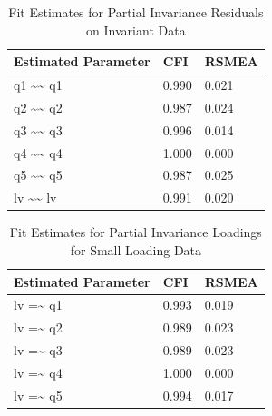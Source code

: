 \documentclass[
  man]{apa7}
\begin{document}
\begin{table}[tbp]

\begin{center}
\begin{threeparttable}

\caption{\label{tab:p-tab11}Fit Estimates for Partial Invariance Residuals on Invariant Data}

\begin{tabular}{lll}
\toprule
Estimated Parameter & CFI & RSMEA\\
\midrule
q1 \textasciitilde{}\textasciitilde{} q1 & 0.990 & 0.021\\
q2 \textasciitilde{}\textasciitilde{} q2 & 0.987 & 0.024\\
q3 \textasciitilde{}\textasciitilde{} q3 & 0.996 & 0.014\\
q4 \textasciitilde{}\textasciitilde{} q4 & 1.000 & 0.000\\
q5 \textasciitilde{}\textasciitilde{} q5 & 0.987 & 0.025\\
lv \textasciitilde{}\textasciitilde{} lv & 0.991 & 0.020\\
\bottomrule
\end{tabular}

\end{threeparttable}
\end{center}

\end{table}

\begin{table}[tbp]

\begin{center}
\begin{threeparttable}

\caption{\label{tab:p-tab12}Fit Estimates for Partial Invariance Loadings for Small Loading Data}

\begin{tabular}{lll}
\toprule
Estimated Parameter & CFI & RSMEA\\
\midrule
lv =\textasciitilde{} q1 & 0.993 & 0.019\\
lv =\textasciitilde{} q2 & 0.989 & 0.023\\
lv =\textasciitilde{} q3 & 0.989 & 0.023\\
lv =\textasciitilde{} q4 & 1.000 & 0.000\\
lv =\textasciitilde{} q5 & 0.994 & 0.017\\
\bottomrule
\end{tabular}

\end{threeparttable}
\end{center}

\end{table}
\end{document}
